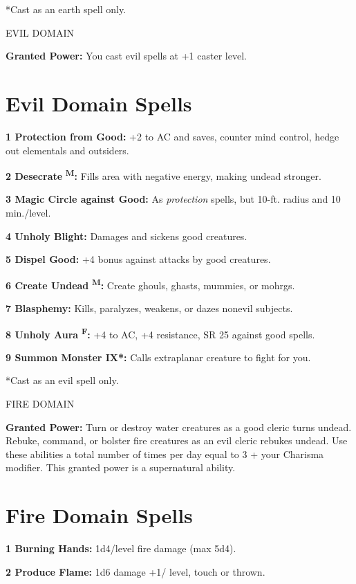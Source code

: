 \documentclass{article}
\begin{document}
*Cast as an earth spell only.

\vspace{12pt}
EVIL DOMAIN

\textbf{Granted Power:} You cast evil spells at +1 caster level.

\section*{\textbf{Evil Domain Spells}}

\textbf{1 Protection from Good: }+2 to AC and saves, counter mind control, hedge 
out elementals and outsiders.

\textbf{2 Desecrate }\textsuperscript{\textbf{M}}\textbf{:} Fills area with negative 
energy, making undead stronger.

\textbf{3 Magic Circle against Good: }As \textit{protection }spells, but 10-ft. 
radius and 10 min./level.

\textbf{4 Unholy Blight:} Damages and sickens good creatures.

\textbf{5 Dispel Good:} +4 bonus against attacks by good creatures.

\textbf{6 Create Undead }\textsuperscript{\textbf{M}}\textbf{: }Create ghouls, 
ghasts, mummies, or mohrgs.

\textbf{7 Blasphemy: }Kills, paralyzes, weakens, or dazes nonevil subjects.

\textbf{8 Unholy Aura }\textsuperscript{\textbf{F}}\textbf{: }+4 to AC, +4 resistance, 
SR 25 against good spells.

\textbf{9 Summon Monster IX*:} Calls extraplanar creature to fight for you.

*Cast as an evil spell only.

\vspace{12pt}
FIRE DOMAIN

\textbf{Granted Power:} Turn or destroy water creatures as a good cleric turns 
undead. Rebuke, command, or bolster fire creatures as an evil cleric rebukes undead. 
Use these abilities a total number of times per day equal to 3 + your Charisma 
modifier. This granted power is a supernatural ability.

\section*{\textbf{Fire Domain Spells}}

\textbf{1 Burning Hands:} 1d4/level fire damage (max 5d4).

\textbf{2 Produce Flame: }1d6 damage +1/ level, touch or thrown.
\end{document}
